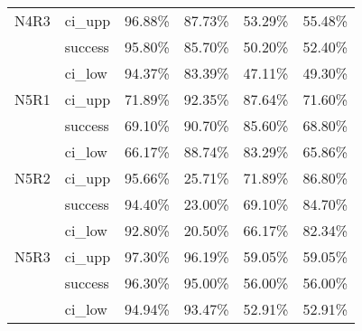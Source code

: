 \begin{tabular}{llrrrr}
N4R3 & ci\_upp &      96.88\% & 87.73\% &       53.29\% & 55.48\% \\
     & success &      95.80\% & 85.70\% &       50.20\% & 52.40\% \\
     & ci\_low &      94.37\% & 83.39\% &       47.11\% & 49.30\% \\
N5R1 & ci\_upp &      71.89\% & 92.35\% &       87.64\% & 71.60\% \\
     & success &      69.10\% & 90.70\% &       85.60\% & 68.80\% \\
     & ci\_low &      66.17\% & 88.74\% &       83.29\% & 65.86\% \\
N5R2 & ci\_upp &      95.66\% & 25.71\% &       71.89\% & 86.80\% \\
     & success &      94.40\% & 23.00\% &       69.10\% & 84.70\% \\
     & ci\_low &      92.80\% & 20.50\% &       66.17\% & 82.34\% \\
N5R3 & ci\_upp &      97.30\% & 96.19\% &       59.05\% & 59.05\% \\
     & success &      96.30\% & 95.00\% &       56.00\% & 56.00\% \\
     & ci\_low &      94.94\% & 93.47\% &       52.91\% & 52.91\% \\
\bottomrule
\end{tabular}

